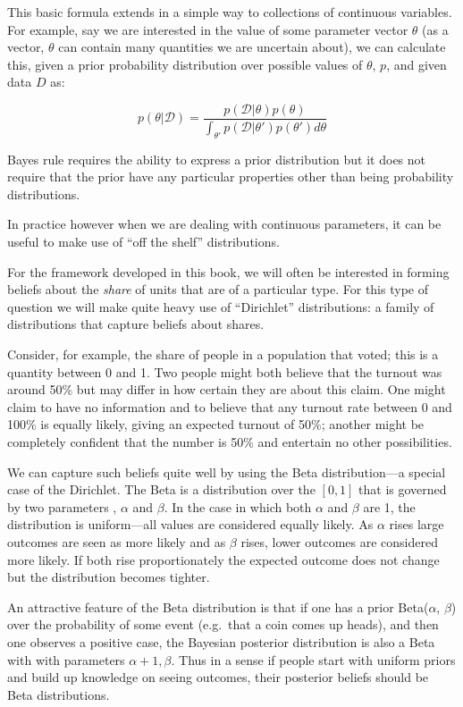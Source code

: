 \documentclass[
  12pt,
]{book}
\begin{document}
This basic formula extends in a simple way to collections of continuous variables. For example, say we are interested in the value of some parameter vector \(\theta\) (as a vector, \(\theta\) can contain many quantities we are uncertain about), we can calculate this, given a prior probability distribution over possible values of \(\theta\), \(p\), and given data \(D\) as:

\[p(\theta|\mathcal{D})=\frac{p(\mathcal{D}|\theta)p(\theta)}{\int_{\theta'}p(\mathcal{D|\theta'})p(\theta')d\theta}\]

Bayes rule requires the ability to express a prior distribution but it does not require that the prior have any particular properties other than being probability distributions.

In practice however when we are dealing with continuous parameters, it can be useful to make use of ``off the shelf'' distributions.

For the framework developed in this book, we will often be interested in forming beliefs about the \emph{share} of units that are of a particular type. For this type of question we will make quite heavy use of ``Dirichlet'' distributions: a family of distributions that capture beliefs about shares.

Consider, for example, the share of people in a population that voted; this is a quantity between 0 and 1. Two people might both believe that the turnout was around 50\% but may differ in how certain they are about this claim. One might claim to have no information and to believe that any turnout rate between 0 and 100\% is equally likely, giving an expected turnout of 50\%; another might be completely confident that the number is 50\% and entertain no other possibilities.

We can capture such beliefs quite well by using the Beta distribution---a special case of the Dirichlet. The Beta is a distribution over the \([0,1]\) that is governed by two parameters , \(\alpha\) and \(\beta\). In the case in which both \(\alpha\) and \(\beta\) are 1, the distribution is uniform---all values are considered equally likely. As \(\alpha\) rises large outcomes are seen as more likely and as \(\beta\) rises, lower outcomes are considered more likely. If both rise proportionately the expected outcome does not change but the distribution becomes tighter.

An attractive feature of the Beta distribution is that if one has a prior Beta(\(\alpha\), \(\beta\)) over the probability of some event (e.g.~that a coin comes up heads), and then one observes a positive case, the Bayesian posterior distribution is also a Beta with with parameters \(\alpha+1, \beta\). Thus in a sense if people start with uniform priors and build up knowledge on seeing outcomes, their posterior beliefs should be Beta distributions.
\end{document}
